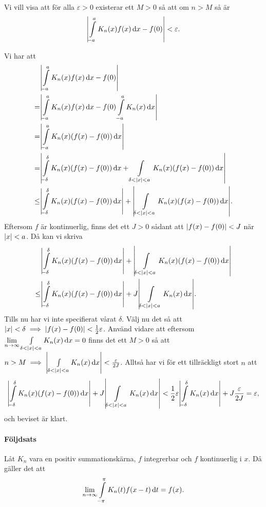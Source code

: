 \proof
Vi vill visa att för alla $\varepsilon > 0$ existerar ett $M > 0$ så att om $n > M$ så är
\begin{align*}
	\abs{\int\limits_{-a}^{a}K_{n}(x)f(x)\dd{x} - f(0)} < \varepsilon.
\end{align*}

Vi har att
\begin{align*}
         &\abs{\int\limits_{-a}^{a}K_{n}(x)f(x)\dd{x} - f(0)} \\
	=    &\abs{\int\limits_{-a}^{a}K_{n}(x)f(x)\dd{x} - f(0)\int\limits_{-a}^{a}K_{n}(x)\dd{x}} \\
	=    & \abs{\int\limits_{-a}^{a}K_{n}(x)(f(x) - f(0))\dd{x}} \\
	=    & \abs{\int\limits_{-\delta}^{\delta}K_{n}(x)(f(x) - f(0))\dd{x} + \int\limits_{\delta < \abs{x} < a}^{}K_{n}(x)(f(x) - f(0))\dd{x}} \\
	\leq & \abs{\int\limits_{-\delta}^{\delta}K_{n}(x)(f(x) - f(0))\dd{x}} + \abs{\int\limits_{\delta < \abs{x} < a}^{}K_{n}(x)(f(x) - f(0))\dd{x}}.
\end{align*}
Eftersom $f$ är kontinuerlig, finns det ett $J > 0$ sådant att $\abs{f(x) - f(0)} < J$ när $\abs{x} < a$. Då kan vi skriva
\begin{align*}
	     &\abs{\int\limits_{-\delta}^{\delta}K_{n}(x)(f(x) - f(0))\dd{x}} + \abs{\int\limits_{\delta < \abs{x} < a}^{}K_{n}(x)(f(x) - f(0))\dd{x}} \\
	\leq & \abs{\int\limits_{-\delta}^{\delta}K_{n}(x)(f(x) - f(0))\dd{x}} + J\abs{\int\limits_{\delta < \abs{x} < a}^{}K_{n}(x)\dd{x}}.
\end{align*}
Tills nu har vi inte specifierat vårat $\delta$. Välj nu det så att $\abs{x} < \delta\implies\abs{f(x) - f(0)} < \frac{1}{2}\varepsilon$. Använd vidare att eftersom $\lim\limits_{n\to\infty}\int\limits_{\delta < \abs{x} < a}^{}K_{n}(x)\dd{x} = 0$ finns det ett $M > 0$ så att $n > M\implies \abs{\int\limits_{\delta < \abs{x} < a}^{}K_{n}(x)\dd{x}} < \frac{\varepsilon}{2J}$. Alltså har vi för ett tillräckligt stort $n$ att
\begin{align*}
	\abs{\int\limits_{-\delta}^{\delta}K_{n}(x)(f(x) - f(0))\dd{x}} + J\abs{\int\limits_{\delta < \abs{x} < a}^{}K_{n}(x)\dd{x}} < \frac{1}{2}\varepsilon\abs{\int\limits_{-\delta}^{\delta}K_{n}(x)\dd{x}} + J\frac{\varepsilon}{2J} = \varepsilon,
\end{align*}
och beviset är klart.

\paragraph{Följdsats}
Låt $K_{n}$ vara en positiv summationskärna, $f$ integrerbar och $f$ kontinuerlig i $x$. Då gäller det att
\begin{align*}
	\lim\limits_{n\to\infty}\int\limits_{-\pi}^{\pi}K_{n}(t)f(x - t)\dd{t} = f(x).
\end{align*}

